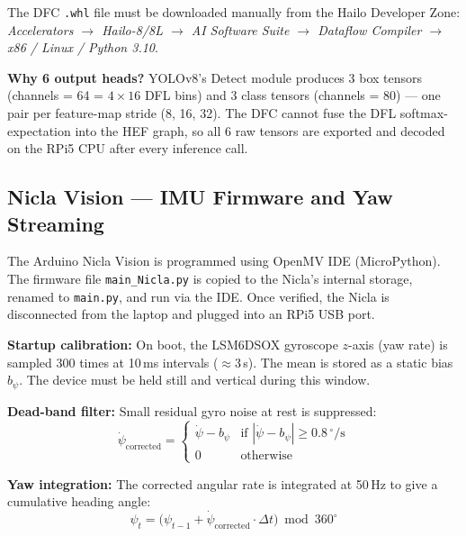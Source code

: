 \documentclass[journal, onecolumn]{IEEEtran}
\begin{document}
The DFC \texttt{.whl} file must be downloaded manually from the Hailo Developer Zone: \textit{Accelerators $\to$ Hailo-8/8L $\to$ AI Software Suite $\to$ Dataflow Compiler $\to$ x86 / Linux / Python 3.10}.

\begin{infobox}
\textbf{Why 6 output heads?} YOLOv8's Detect module produces 3 box tensors (channels = 64 = $4 \times 16$ DFL bins) and 3 class tensors (channels = 80) — one pair per feature-map stride (8, 16, 32). The DFC cannot fuse the DFL softmax-expectation into the HEF graph, so all 6 raw tensors are exported and decoded on the RPi5 CPU after every inference call.
\end{infobox}

\subsection{Nicla Vision — IMU Firmware and Yaw Streaming}
\label{sec:nicla}

The Arduino Nicla Vision is programmed using OpenMV IDE (MicroPython). The firmware file \texttt{main\_Nicla.py} is copied to the Nicla's internal storage, renamed to \texttt{main.py}, and run via the IDE. Once verified, the Nicla is disconnected from the laptop and plugged into an RPi5 USB port.

\textbf{Startup calibration:} On boot, the LSM6DSOX gyroscope $z$-axis (yaw rate) is sampled 300 times at 10\,ms intervals ($\approx$3\,s). The mean is stored as a static bias $b_\psi$. The device must be held still and vertical during this window.

\textbf{Dead-band filter:} Small residual gyro noise at rest is suppressed:
\begin{equation}
  \dot{\psi}_\text{corrected} = \begin{cases}
    \dot{\psi} - b_\psi & \text{if } |\dot{\psi} - b_\psi| \geq 0.8\,^\circ\!/\text{s} \\
    0 & \text{otherwise}
  \end{cases}
\end{equation}

\textbf{Yaw integration:} The corrected angular rate is integrated at 50\,Hz to give a cumulative heading angle:
\begin{equation}
  \psi_t = \bigl(\psi_{t-1} + \dot{\psi}_\text{corrected} \cdot \Delta t\bigr) \bmod 360^\circ
\end{equation}
\end{document}
